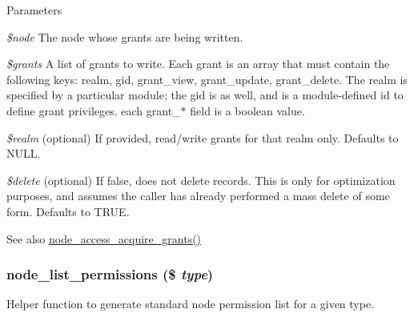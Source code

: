 \begin{DoxyParams}{Parameters}
\item[{\em \$node}]The node whose grants are being written. \item[{\em \$grants}]A list of grants to write. Each grant is an array that must contain the following keys: realm, gid, grant\_\-view, grant\_\-update, grant\_\-delete. The realm is specified by a particular module; the gid is as well, and is a module-\/defined id to define grant privileges. each grant\_\-$\ast$ field is a boolean value. \item[{\em \$realm}](optional) If provided, read/write grants for that realm only. Defaults to NULL. \item[{\em \$delete}](optional) If false, does not delete records. This is only for optimization purposes, and assumes the caller has already performed a mass delete of some form. Defaults to TRUE.\end{DoxyParams}
\begin{DoxySeeAlso}{See also}
\hyperlink{group__node__access_ga6fbbc13a4098f72663c0a67f81100f67}{node\_\-access\_\-acquire\_\-grants()} 
\end{DoxySeeAlso}
\hypertarget{group__node__access_ga929efd16564e3cb073ee5e1ed6c6c2a7}{
\subsubsection[{node\_\-list\_\-permissions}]{\setlength{\rightskip}{0pt plus 5cm}node\_\-list\_\-permissions (\$ {\em type})}}
\label{group__node__access_ga929efd16564e3cb073ee5e1ed6c6c2a7}
Helper function to generate standard node permission list for a given type.


